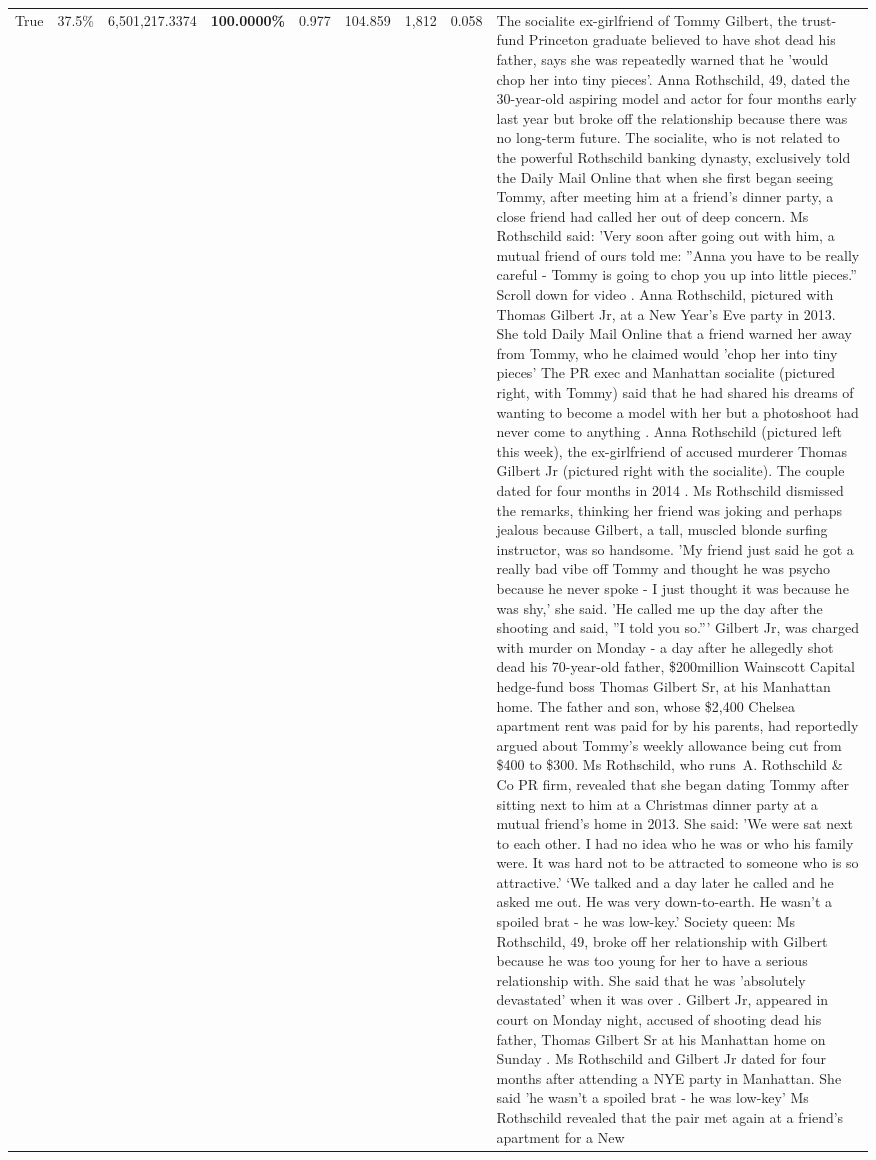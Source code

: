 \begin{table}[H]
\begin{tabular}{lllrlllll}
True & 37.5\% & 6,501,217.3374 & \bfseries \color{red} 100.0000\% & 0.977 & 104.859 & 1,812 & 0.058 & The socialite ex-girlfriend of Tommy Gilbert, the trust-fund Princeton graduate believed to have shot dead his father, says she was repeatedly warned that he 'would chop her into tiny pieces'. Anna Rothschild, 49, dated the 30-year-old aspiring model and actor for four months early last year but broke off the relationship because there was no long-term future. The socialite, who is not related to the powerful Rothschild banking dynasty, exclusively told the Daily Mail Online that when she first began seeing Tommy, after meeting him at a friend's dinner party, a close friend had called her out of deep concern. Ms Rothschild said: 'Very soon after going out with him, a mutual friend of ours told me: ''Anna you have to be really careful - Tommy is going to chop you up into little pieces.'' Scroll down for video . Anna Rothschild, pictured with Thomas Gilbert Jr, at a New Year's Eve party in 2013. She told Daily Mail Online that a friend warned her away from Tommy, who he claimed would 'chop her into tiny pieces' The PR exec and Manhattan socialite (pictured right, with Tommy) said that he had shared his dreams of wanting to become a model with her but a photoshoot had never come to anything . Anna Rothschild (pictured left this week), the ex-girlfriend of accused murderer Thomas Gilbert Jr (pictured right with the socialite). The couple dated for four months in 2014 . Ms Rothschild dismissed the remarks, thinking her friend was joking and perhaps jealous because Gilbert, a tall, muscled blonde surfing instructor, was so handsome. 'My friend just said he got a really bad vibe off Tommy and thought he was psycho because he never spoke - I just thought it was because he was shy,' she said. 'He called me up the day after the shooting and said, ''I told you so.''' Gilbert Jr, was charged with murder on Monday - a day after he allegedly shot dead his 70-year-old father, \$200million Wainscott Capital hedge-fund boss Thomas Gilbert Sr, at his Manhattan home. The father and son, whose \$2,400 Chelsea apartment rent was paid for by his parents, had reportedly argued about Tommy's weekly allowance being cut from \$400 to \$300. Ms Rothschild, who runs A. Rothschild \& Co PR firm, revealed that she began dating Tommy after sitting next to him at a Christmas dinner party at a mutual friend's home in 2013. She said: 'We were sat next to each other. I had no idea who he was or who his family were. It was hard not to be attracted to someone who is so attractive.' ‘We talked and a day later he called and he asked me out. He was very down-to-earth. He wasn’t a spoiled brat - he was low-key.’ Society queen: Ms Rothschild, 49, broke off her relationship with Gilbert because he was too young for her to have a serious relationship with. She said that he was 'absolutely devastated' when it was over . Gilbert Jr, appeared in court on Monday night, accused of shooting dead his father, Thomas Gilbert Sr at his Manhattan home on Sunday . Ms Rothschild and Gilbert Jr dated for four months after attending a NYE party in Manhattan. She said 'he wasn't a spoiled brat - he was low-key' Ms Rothschild revealed that the pair met again at a friend’s apartment for a New 
\end{tabular}
\end{table}
